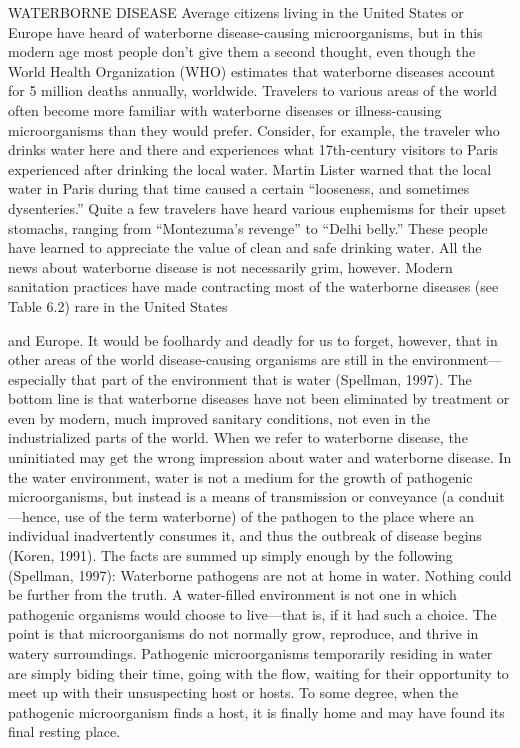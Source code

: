 \documentclass{article}
\begin{document}
WATERBORNE DISEASE Average citizens living in the United States or
Europe have heard of waterborne disease-causing microorganisms, but in
this modern age most people don't give them a second thought, even
though the World Health Organization (WHO) estimates that waterborne
diseases account for 5 million deaths annually, worldwide. Travelers to
various areas of the world often become more familiar with waterborne
diseases or illness-causing microorganisms than they would prefer.
Consider, for example, the traveler who drinks water here and there and
experiences what 17th-century visitors to Paris experienced after
drinking the local water. Martin Lister warned that the local water in
Paris during that time caused a certain ``looseness, and sometimes
dysenteries.'' Quite a few travelers have heard various euphemisms for
their upset stomachs, ranging from ``Montezuma's revenge'' to ``Delhi
belly.'' These people have learned to appreciate the value of clean and
safe drinking water. All the news about waterborne disease is not
necessarily grim, however. Modern sanitation practices have made
contracting most of the waterborne diseases (see Table 6.2) rare in the
United States

and Europe. It would be foolhardy and deadly for us to forget, however,
that in other areas of the world disease-causing organisms are still in
the environment---especially that part of the environment that is water
(Spellman, 1997). The bottom line is that waterborne diseases have not
been eliminated by treatment or even by modern, much improved sanitary
conditions, not even in the industrialized parts of the world. When we
refer to waterborne disease, the uninitiated may get the wrong
impression about water and waterborne disease. In the water environment,
water is not a medium for the growth of pathogenic microorganisms, but
instead is a means of transmission or conveyance (a conduit---hence, use
of the term waterborne) of the pathogen to the place where an individual
inadvertently consumes it, and thus the outbreak of disease begins
(Koren, 1991). The facts are summed up simply enough by the following
(Spellman, 1997): Waterborne pathogens are not at home in water. Nothing
could be further from the truth. A water-filled environment is not one
in which pathogenic organisms would choose to live---that is, if it had
such a choice. The point is that microorganisms do not normally grow,
reproduce, and thrive in watery surroundings. Pathogenic microorganisms
temporarily residing in water are simply biding their time, going with
the flow, waiting for their opportunity to meet up with their
unsuspecting host or hosts. To some degree, when the pathogenic
microorganism finds a host, it is finally home and may have found its
final resting place.
\end{document}
